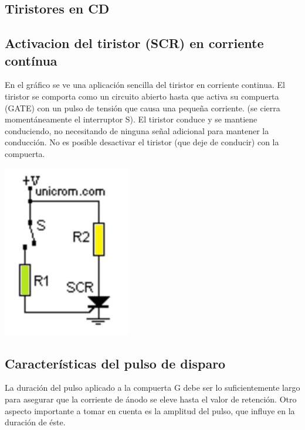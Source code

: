 \documentclass[12pt,a4paper]{article}
\begin{document}
\begin{center}
\section{Tiristores en CD}
\subsection{Activacion del tiristor (SCR) en corriente contínua}
\end{center}
\begin{flushleft}
En el gráfico se ve una aplicación sencilla del tiristor en corriente continua. El tiristor se comporta como un circuito abierto hasta que activa su compuerta (GATE) con un pulso de tensión que causa una pequeña corriente. (se cierra momentáneamente el interruptor S). El tiristor conduce y se mantiene conduciendo, no necesitando de ninguna señal adicional para mantener la conducción. No es posible desactivar el tiristor (que deje de conducir) con la compuerta.\\
\end{flushleft}
\begin{center}
\includegraphics[scale=1]{imagenes/tiristorCD.JPG} 
\subsection{Características del pulso de disparo}
\end{center}
\begin{flushleft}La duración del pulso aplicado a la compuerta G debe ser lo suficientemente largo para asegurar que la corriente de ánodo se eleve hasta el valor de retención. Otro aspecto importante a tomar en cuenta es la amplitud del pulso, que influye en la duración de éste.\newline
\end{flushleft}
\end{document}
